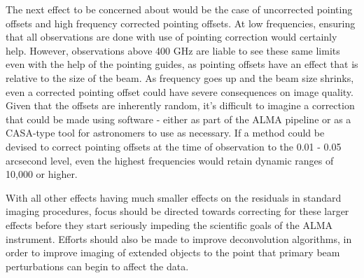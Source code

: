 \documentclass[11pt]{article}
\begin{document}
The next effect to be concerned about would be the case of uncorrected pointing 
offsets and high frequency corrected pointing offsets.
At low frequencies, ensuring that all observations are done with use of 
pointing correction would certainly help. However, observations above 400 GHz 
are liable to see these same limits even with the help of the pointing guides, 
as pointing offsets have an effect that is relative to the size of the beam. As 
frequency goes up and the beam size shrinks, even a corrected pointing offset 
could have severe consequences on image quality. Given that the offsets are 
inherently random, it's difficult to imagine a correction that could be made 
using software - either as part of the ALMA pipeline or as a CASA-type tool for 
astronomers to use as necessary.  If a method could be devised to correct 
pointing offsets at the time of observation to the 0.01 - 0.05 arcsecond level, 
even the highest frequencies would retain dynamic ranges of 10,000 or higher.

With all other effects having much smaller effects on the
residuals in standard imaging procedures, focus should be directed towards
correcting for these larger effects before they start seriously impeding the
scientific goals of the ALMA instrument. Efforts should also be made to improve 
deconvolution algorithms, in order to improve imaging of extended objects to 
the point that primary beam perturbations can begin to affect the data.

{}

\end{document}
